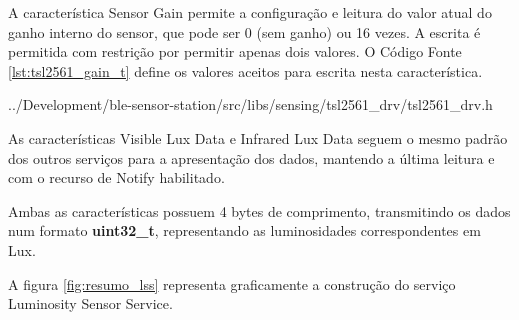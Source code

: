 A característica Sensor Gain permite a configuração e leitura do valor atual do
ganho interno do sensor, que pode ser 0 (sem ganho) ou 16 vezes. A escrita é
permitida com restrição por permitir apenas dois valores. O Código Fonte
\ref{lst:tsl2561_gain_t} define os valores aceitos para escrita nesta
característica.

\begin{minipage}{0.95\linewidth} 

{../Development/ble-sensor-station/src/libs/sensing/tsl2561_drv/tsl2561_drv.h}
\end{minipage}

As características Visible Lux Data e Infrared Lux Data seguem o mesmo padrão
dos outros serviços para a apresentação dos dados, mantendo a última leitura e
com o recurso de Notify habilitado.

Ambas as características possuem 4 bytes de comprimento, transmitindo os dados
num formato \textbf{uint32\_t}, representando as luminosidades correspondentes
em Lux.

A figura \ref{fig:resumo_lss} representa graficamente a construção do serviço
Luminosity Sensor Service.


